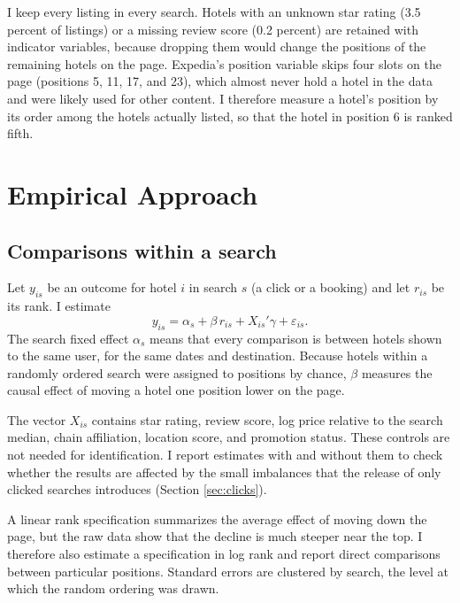 \documentclass[12pt]{article}
\begin{document}
I keep every listing in every search. Hotels with an unknown star rating (3.5 percent of listings) or a missing review score (0.2 percent) are retained with indicator variables, because dropping them would change the positions of the remaining hotels on the page. Expedia's position variable skips four slots on the page (positions 5, 11, 17, and 23), which almost never hold a hotel in the data and were likely used for other content. I therefore measure a hotel's position by its order among the hotels actually listed, so that the hotel in position 6 is ranked fifth.

\section{Empirical Approach}

\subsection{Comparisons within a search}

Let $y_{is}$ be an outcome for hotel $i$ in search $s$ (a click or a booking) and let $r_{is}$ be its rank. I estimate
\begin{equation}
  y_{is} = \alpha_s + \beta\, r_{is} + X_{is}'\gamma + \varepsilon_{is}.
  \label{eq:position}
\end{equation}
The search fixed effect $\alpha_s$ means that every comparison is between hotels shown to the same user, for the same dates and destination. Because hotels within a randomly ordered search were assigned to positions by chance, $\beta$ measures the causal effect of moving a hotel one position lower on the page.

The vector $X_{is}$ contains star rating, review score, log price relative to the search median, chain affiliation, location score, and promotion status. These controls are not needed for identification. I report estimates with and without them to check whether the results are affected by the small imbalances that the release of only clicked searches introduces (Section \ref{sec:clicks}).

A linear rank specification summarizes the average effect of moving down the page, but the raw data show that the decline is much steeper near the top. I therefore also estimate a specification in log rank and report direct comparisons between particular positions. Standard errors are clustered by search, the level at which the random ordering was drawn.
\end{document}
